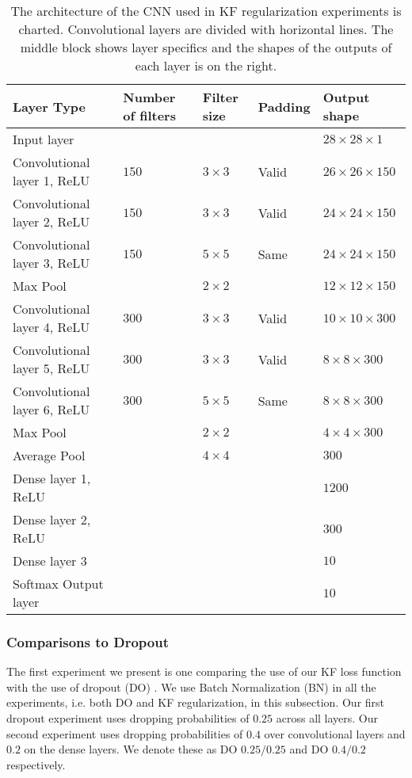 \documentclass[11pt]{article}
\begin{document}
\begin{table}
{\scriptsize{
\begin{center}
\begin{tabular}{ | p{3.8cm} || p{1.9cm} p{1.9cm} p{1.9cm} | p{3cm} |}
\hline
\textbf{Layer Type} & \textbf{Number of filters} & \textbf{Filter size} & \textbf{Padding} & \textbf{Output shape} \\
\hline
Input layer & & & & $28 \times 28 \times 1$\\
\hline
Convolutional layer 1, ReLU & $150$ & $3 \times 3$ & Valid & $26 \times 26 \times 150$\\
\hline
Convolutional layer 2, ReLU & $150$ & $3 \times 3$ & Valid & $24 \times 24 \times 150$\\
\hline
Convolutional layer 3, ReLU & $150$ & $5 \times 5$ & Same & $24 \times 24 \times 150$\\
Max Pool & & $2 \times 2$ & & $12 \times 12 \times 150$\\
\hline
Convolutional layer 4, ReLU & $300$ & $3 \times 3$ & Valid & $10 \times 10 \times 300$\\
\hline
Convolutional layer 5, ReLU & $300$ & $3 \times 3$ & Valid & $8 \times 8 \times 300$\\
\hline
Convolutional layer 6, ReLU & $300$ & $5 \times 5$ & Same & $8 \times 8 \times 300$\\
Max Pool & & $2 \times 2$ & & $4 \times 4 \times 300$\\
Average Pool & & $4 \times 4$ & & $300$\\
\hline
Dense layer 1, ReLU & & & & $1200$\\
\hline
Dense layer 2, ReLU & & & & $300$\\
\hline
Dense layer 3 & & & & $10$\\
\hline
Softmax Output layer & & & & $10$\\
\hline
\end{tabular}
\end{center}
}}
\caption{The architecture of the CNN used in KF regularization experiments is charted.  Convolutional layers are divided with horizontal lines.  The middle block shows layer specifics and the shapes of the outputs of each layer is on the right.}\label{MNIST arch}
\end{table}


\subsubsection{Comparisons to Dropout}
The first experiment we present is one comparing the use of our KF loss function with the use of dropout (DO) \cite{dropout}.  We use Batch Normalization (BN) \cite{batchnorm} in all the experiments, i.e. both DO and KF regularization, in this subsection.  Our first dropout experiment uses dropping probabilities of $0.25$ across all layers. Our second experiment uses  dropping probabilities of $0.4$ over convolutional layers and $0.2$ on the dense layers.  We denote these as DO $0.25/0.25$ and DO $0.4/0.2$ respectively.
\end{document}
